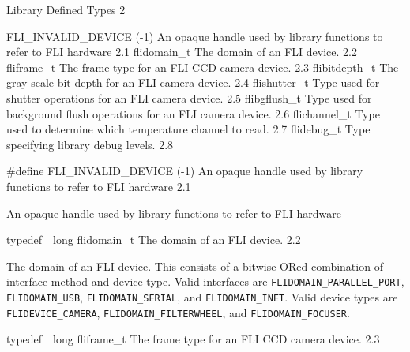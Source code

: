 \documentclass{article}
\begin{document}
\begin{cxxentry}
{}
        {Library Defined Types }
        {}
        {}
        {2}
\begin{cxxnames}
        {FLI\_INVALID\_DEVICE}
        {(-1)}
        { An opaque handle used by library functions to refer to FLI hardware}
        {2.1}
        {flidomain\_t}
        {}
        { The domain of an FLI device.}
        {2.2}
        {fliframe\_t}
        {}
        { The frame type for an FLI CCD camera device.}
        {2.3}
        {flibitdepth\_t}
        {}
        { The gray-scale bit depth for an FLI camera device.}
        {2.4}
        {flishutter\_t}
        {}
        { Type used for shutter operations for an FLI camera device.}
        {2.5}
        {flibgflush\_t}
        {}
        { Type used for background flush operations for an FLI camera device.}
        {2.6}
        {flichannel\_t}
        {}
        { Type used to determine which temperature channel to read.}
        {2.7}
        {flidebug\_t}
        {}
        { Type specifying library debug levels.}
        {2.8}
\end{cxxnames}
\begin{cxxmacro}
{\#define}
        {FLI\_INVALID\_DEVICE}
        {(-1)}
        { An opaque handle used by library functions to refer to FLI hardware}
        {2.1}
\begin{cxxdoc}

An opaque handle used by library functions to refer to FLI
hardware
\end{cxxdoc}
\end{cxxmacro}
\begin{cxxentry}
{typedef\ \ long}
        {flidomain\_t}
        {}
        { The domain of an FLI device.}
        {2.2}
\begin{cxxdoc}

The domain of an FLI device.  This consists of a bitwise ORed
combination of interface method and device type.  Valid interfaces
are \texttt{FLIDOMAIN\_PARALLEL\_PORT}, \texttt{FLIDOMAIN\_USB},
\texttt{FLIDOMAIN\_SERIAL}, and \texttt{FLIDOMAIN\_INET}.  Valid
device types are \texttt{FLIDEVICE\_CAMERA},
\texttt{FLIDOMAIN\_FILTERWHEEL}, and \texttt{FLIDOMAIN\_FOCUSER}.


\end{cxxdoc}
\end{cxxentry}
\begin{cxxentry}
{typedef\ \ long}
        {fliframe\_t}
        {}
        { The frame type for an FLI CCD camera device.}
        {2.3}
\begin{cxxdoc}


\end{cxxdoc}
\end{cxxentry}
\end{cxxentry}
\end{document}
